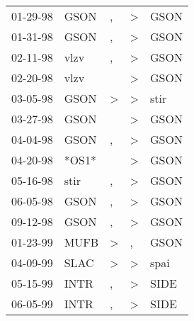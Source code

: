 \begin{supertabular}{p{0.07\textwidth}p{0.06\textwidth}p{0.02\textwidth}p{0.02\textwidth}p{0.06\textwidth}}
 01-29-98\textsuperscript{} &  GSON\textsuperscript{} &             , &  \textgreater &  GSON\textsuperscript{} \\
 01-31-98\textsuperscript{} &  GSON\textsuperscript{} &             , &  \textgreater &  GSON\textsuperscript{} \\
 02-11-98\textsuperscript{} &  vlzv\textsuperscript{} &             , &  \textgreater &  GSON\textsuperscript{} \\
 02-20-98\textsuperscript{} &  vlzv\textsuperscript{} &               &  \textgreater &  GSON\textsuperscript{} \\
 03-05-98\textsuperscript{} &  GSON\textsuperscript{} &  \textgreater &  \textgreater &  stir\textsuperscript{} \\
 03-27-98\textsuperscript{} &  GSON\textsuperscript{} &               &  \textgreater &  GSON\textsuperscript{} \\
 04-04-98\textsuperscript{} &  GSON\textsuperscript{} &             , &  \textgreater &  GSON\textsuperscript{} \\
 04-20-98\textsuperscript{} &                   *OS1* &               &  \textgreater &  GSON\textsuperscript{} \\
 05-16-98\textsuperscript{} &  stir\textsuperscript{} &             , &  \textgreater &  GSON\textsuperscript{} \\
 06-05-98\textsuperscript{} &  GSON\textsuperscript{} &             , &  \textgreater &  GSON\textsuperscript{} \\
 09-12-98\textsuperscript{} &  GSON\textsuperscript{} &             , &  \textgreater &  GSON\textsuperscript{} \\
 01-23-99\textsuperscript{} &  MUFB\textsuperscript{} &  \textgreater &             , &  GSON\textsuperscript{} \\
 04-09-99\textsuperscript{} &  SLAC\textsuperscript{} &  \textgreater &  \textgreater &  spai\textsuperscript{} \\
 05-15-99\textsuperscript{} &  INTR\textsuperscript{} &             , &  \textgreater &  SIDE\textsuperscript{} \\
 06-05-99\textsuperscript{} &  INTR\textsuperscript{} &             , &  \textgreater &  SIDE\textsuperscript{} \\
\end{supertabular}
